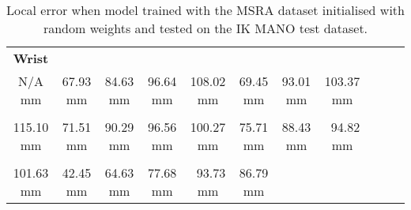     \begin{table}[!ht]
    \begin{tabular}{|c|c|c|c|c|c|c|c|c|c|c|}
    \hline
    {\bfseries Wrist} & \cellcolor[HTML]{ff8000}{\bfseries IMCP} & \cellcolor[HTML]{ff2500}{\bfseries IPIP} & \cellcolor[HTML]{ff0000}{\bfseries IDIP} & \cellcolor[HTML]{ff0000}{\bfseries ITIP} & \cellcolor[HTML]{ff8000}{\bfseries MMCP} & \cellcolor[HTML]{ff0000}{\bfseries MPIP} & \cellcolor[HTML]{ff0000}{\bfseries MDIP}  \\
    N/A mm & \cellcolor[HTML]{ff8000}$\,\,\,$67.93 mm & \cellcolor[HTML]{ff2500}$\,\,\,$84.63 mm & \cellcolor[HTML]{ff0000}$\,\,\,$96.64 mm & \cellcolor[HTML]{ff0000}108.02 mm & \cellcolor[HTML]{ff8000}$\,\,\,$69.45 mm & \cellcolor[HTML]{ff0000}$\,\,\,$93.01 mm & \cellcolor[HTML]{ff0000}103.37 mm\\
    \hline
    \cellcolor[HTML]{ff0000}{\bfseries MTIP} & \cellcolor[HTML]{ff7500}{\bfseries RMCP} & \cellcolor[HTML]{ff0000}{\bfseries RPIP} & \cellcolor[HTML]{ff0000}{\bfseries RDIP} & \cellcolor[HTML]{ff0000}{\bfseries RTIP} & \cellcolor[HTML]{ff7500}{\bfseries PMCP} & \cellcolor[HTML]{ff2500}{\bfseries PPIP} & \cellcolor[HTML]{ff0000}{\bfseries PDIP}  \\
    \cellcolor[HTML]{ff0000}115.10 mm & \cellcolor[HTML]{ff7500}$\,\,\,$71.51 mm & \cellcolor[HTML]{ff0000}$\,\,\,$90.29 mm & \cellcolor[HTML]{ff0000}$\,\,\,$96.56 mm & \cellcolor[HTML]{ff0000}100.27 mm & \cellcolor[HTML]{ff7500}$\,\,\,$75.71 mm & \cellcolor[HTML]{ff2500}$\,\,\,$88.43 mm & \cellcolor[HTML]{ff0000}$\,\,\,$94.82 mm\\
    \hline
    \cellcolor[HTML]{ff0000}{\bfseries PTIP} & \cellcolor[HTML]{ffff00}{\bfseries TMCP} & \cellcolor[HTML]{ff8000}{\bfseries TPIP} & \cellcolor[HTML]{ff7500}{\bfseries PDIP} & \cellcolor[HTML]{ff0000}{\bfseries TTIP} & \cellcolor[HTML]{ff2500}{\bfseries Average}  \\
    \cellcolor[HTML]{ff0000}101.63 mm & \cellcolor[HTML]{ffff00}$\,\,\,$42.45 mm & \cellcolor[HTML]{ff8000}$\,\,\,$64.63 mm & \cellcolor[HTML]{ff7500}$\,\,\,$77.68 mm & \cellcolor[HTML]{ff0000}$\,\,\,$93.73 mm & \cellcolor[HTML]{ff2500}$\,\,\,$86.79 mm \\
    \cline{1-6}
    \end{tabular}
    \caption{Local error when model trained with the MSRA dataset initialised with random weights and tested on the IK MANO test dataset.}
    \label{tb:baseline_maya:l}
    \end{table}